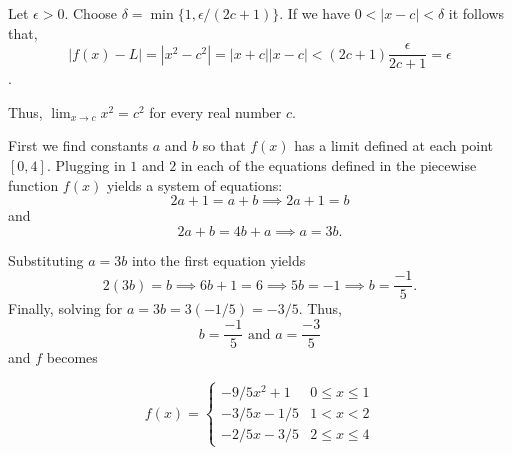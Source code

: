 \documentclass{report}
\begin{document}

\begin{myproof}
  Let $\epsilon > 0.$ Choose $\delta = \min\{1, \epsilon/(2c+1)\}$. If we have $0 < |x-c| < \delta$ it follows that, $$|f(x) - L| = |x^2 - c^2| = |x + c||x-c| < (2c+1)\frac{\epsilon}{2c+1} = \epsilon$$.

Thus, $\lim _{x \rightarrow c} x^2=c^2$ for every real number $c$.
\end{myproof}

\bigskip
\sol

First we find constants $a$ and $b$ so that $f(x)$ has a limit defined at each point $[0,4].$ Plugging in $1$ and $2$ in each of the equations defined in the piecewise function $f(x)$ yields a system of equations:$$ 2a +1 = a + b \implies 2a +1 = b$$
and $$2a +b = 4b + a \implies a = 3b.$$

Substituting $a = 3b$ into the first equation yields $$2(3b) = b \implies 6b + 1 =6 \implies 5b = -1 \implies b = \frac{-1}{5}.$$ Finally, solving for $a = 3b = 3 (-1/5) = -3/5.$ Thus, $$ b = \frac{-1}{5} \text { and } a = \frac{-3}{5} $$ and $f$ becomes


$$
f(x)=\left\{\begin{array}{cc}
-9/5 x^2+1 & 0 \leq x \leq 1 \\
-3/5 x - 1/5 & 1<x<2 \\
-2/5 x - 3/5 & 2 \leq x \leq 4
\end{array}\right.
$$
\end{document}
